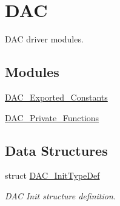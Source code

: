\hypertarget{group___d_a_c}{\section{D\-A\-C}
\label{group___d_a_c}
}


D\-A\-C driver modules.  


\subsection*{Modules}
\begin{DoxyCompactItemize}
\item 
\hyperlink{group___d_a_c___exported___constants}{D\-A\-C\-\_\-\-Exported\-\_\-\-Constants}
\item 
\hyperlink{group___d_a_c___private___functions}{D\-A\-C\-\_\-\-Private\-\_\-\-Functions}
\end{DoxyCompactItemize}
\subsection*{Data Structures}
\begin{DoxyCompactItemize}
\item 
struct \hyperlink{struct_d_a_c___init_type_def}{D\-A\-C\-\_\-\-Init\-Type\-Def}
\begin{DoxyCompactList}\small\item\em D\-A\-C Init structure definition. \end{DoxyCompactList}\end{DoxyCompactItemize}
